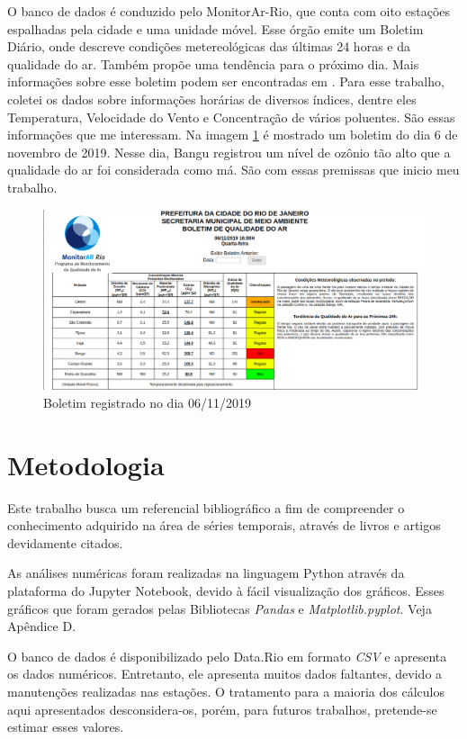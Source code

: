 O banco de dados é conduzido pelo MonitorAr-Rio, que conta com oito estações
espalhadas pela cidade e uma unidade móvel.  Esse órgão emite um Boletim
Diário, onde descreve condições metereológicas das últimas 24 horas e da
qualidade do ar. Também propõe uma tendência para o próximo dia. Mais
informações sobre esse boletim podem ser encontradas em \cite{boletim}. Para
esse trabalho, coletei os dados sobre informações horárias de diversos
índices, dentre eles Temperatura, Velocidade do Vento e Concentração de vários
poluentes. São essas informações que me interessam. Na imagem \ref{boletim} é
mostrado um boletim do dia 6 de novembro de 2019. Nesse dia, Bangu registrou
um nível de ozônio tão alto que a qualidade do ar foi considerada como má. São
com essas premissas que inicio meu trabalho. 

\begin{figure}[!ht]  
    \includegraphics[width=\linewidth]{img/boletim6-11-2019.png}
    \caption{Boletim registrado no dia 06/11/2019}
    \label{boletim}
\end{figure}

\section{Metodologia}

Este trabalho busca um referencial bibliográfico a fim de compreender o
conhecimento adquirido na área de séries temporais, através de livros e
artigos devidamente citados. 

As análises numéricas foram realizadas na linguagem Python através da
plataforma do Jupyter Notebook, devido à fácil visualização dos gráficos.
Esses gráficos que foram gerados pelas Bibliotecas \textit{Pandas} e
\textit{Matplotlib.pyplot}. Veja Apêndice D.

O banco de dados é disponibilizado pelo Data.Rio em formato \textit{CSV} e
apresenta os dados numéricos. Entretanto, ele apresenta muitos dados
faltantes, devido a manutenções realizadas nas estações. O tratamento para a
maioria dos cálculos aqui apresentados desconsidera-os, porém, para futuros
trabalhos, pretende-se estimar esses valores. 